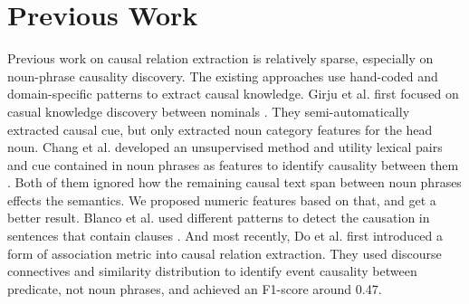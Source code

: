 \section{Previous Work}
\label{sec:related}
Previous work on causal relation extraction is relatively sparse,
especially on noun-phrase causality discovery. The existing approaches
use hand-coded and domain-specific patterns to extract causal knowledge.
Girju et al. first focused on casual knowledge discovery between nominals
\cite{girju2003automatic}. They semi-automatically extracted causal cue, but only extracted noun category features for the head noun. Chang et al. developed an unsupervised method and utility lexical pairs and cue contained in noun phrases as features to identify causality between them \cite{chang2006incremental}. Both of them ignored how the remaining causal text span between noun phrases effects the semantics. We proposed numeric features based on that, and get a better result.
Blanco et al. used different patterns to detect the causation in sentences
that contain clauses \cite{blanco2008causal}. And most recently, Do et al.
\cite{do2011minimally}
first introduced a form of association metric into causal relation extraction.
They used discourse connectives and similarity distribution to identify
event causality between predicate, not noun phrases,
and achieved an F1-score around 0.47.


